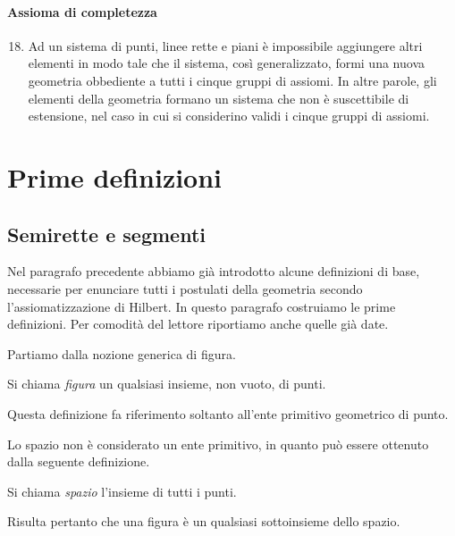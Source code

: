 \paragraph{Assioma di completezza}

\begin{enumerate}[label=\Roman{*}., nosep]
\setcounter{enumi}{17}
\item Ad un sistema di punti, linee rette e piani è impossibile 
aggiungere altri elementi in modo tale che il sistema, così 
generalizzato, formi una nuova geometria obbediente a tutti i cinque 
gruppi di assiomi. In altre parole, gli elementi della geometria 
formano un sistema che non è suscettibile di estensione, nel caso in 
cui si considerino validi i cinque gruppi di assiomi.
\end{enumerate}



\section{Prime definizioni}\label{sect:prime_definizioni}

\subsection{Semirette e segmenti}

Nel paragrafo precedente abbiamo già introdotto alcune definizioni di 
base, necessarie per enunciare tutti i postulati della geometria 
secondo l'assiomatizzazione di Hilbert. In questo paragrafo 
costruiamo le prime definizioni. Per comodità del lettore riportiamo 
anche quelle già date.

Partiamo dalla nozione generica di figura.
\begin{definizione}
Si chiama \emph{figura} un qualsiasi insieme, non vuoto, di punti.
\end{definizione}
Questa definizione fa riferimento soltanto all'ente primitivo 
geometrico di punto.

Lo spazio non è considerato un ente primitivo, in quanto può essere 
ottenuto dalla seguente definizione.
\begin{definizione}
Si chiama \emph{spazio} l'insieme di tutti i punti.
\end{definizione}
Risulta pertanto che una figura è un qualsiasi sottoinsieme dello 
spazio.

